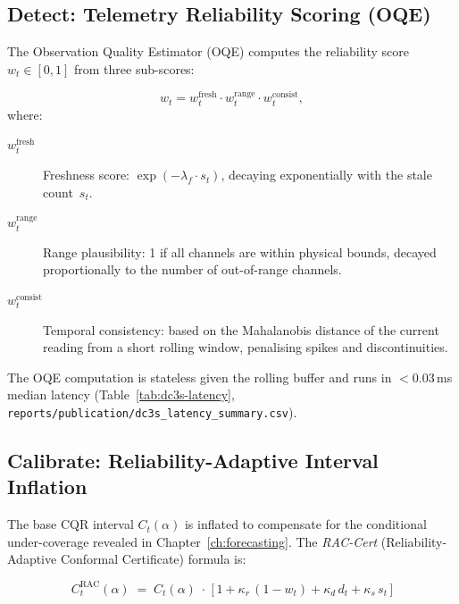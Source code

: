 \subsection{Detect: Telemetry Reliability Scoring (OQE)}
\label{sec:detect}

The Observation Quality Estimator (OQE) computes the reliability score
$w_t \in [0, 1]$ from three sub-scores:

\begin{equation}
\label{eq:oqe}
  w_t = w_t^{\mathrm{fresh}} \cdot w_t^{\mathrm{range}} \cdot w_t^{\mathrm{consist}},
\end{equation}
where:
\begin{description}
  \item[$w_t^{\mathrm{fresh}}$] Freshness score: $\exp(-\lambda_f \cdot s_t)$,
    decaying exponentially with the stale count~$s_t$.
  \item[$w_t^{\mathrm{range}}$] Range plausibility: 1 if all channels are
    within physical bounds, decayed proportionally to the number of
    out-of-range channels.
  \item[$w_t^{\mathrm{consist}}$] Temporal consistency: based on the
    Mahalanobis distance of the current reading from a short rolling window,
    penalising spikes and discontinuities.
\end{description}

The OQE computation is stateless given the rolling buffer and runs in
$<0.03$\,ms median latency
(Table~\ref{tab:dc3s-latency}, \texttt{reports/publication/dc3s\_latency\_summary.csv}).

\subsection{Calibrate: Reliability-Adaptive Interval Inflation}
\label{sec:calibrate}

The base CQR interval $C_t(\alpha)$ is inflated to compensate for the
conditional under-coverage revealed in Chapter~\ref{ch:forecasting}.  The
\emph{RAC-Cert} (Reliability-Adaptive Conformal Certificate) formula is:

\begin{equation}
\label{eq:rac-cert}
\boxed{
  C_t^{\mathrm{RAC}}(\alpha) \;=\;
  C_t(\alpha) \;\cdot\;
  \bigl[\,1 + \kappa_r\,(1 - w_t)
             + \kappa_d\,d_t
             + \kappa_s\,s_t\,\bigr]
}
\end{equation}

